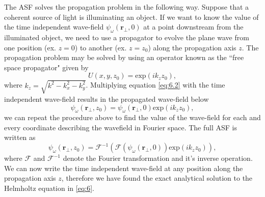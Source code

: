 \documentclass[10pt, a4paper, singlespacing]{report}
\begin{document}
The ASF solves the propagation problem in the following way. Suppose that a coherent source of light is illuminating an object. If we want to know the value of the time independent wave-field $\psi_{\omega}(\mathbf{r_{\perp}}, 0)$ at a point downstream from the illuminated object, we need to use a propagator to evolve the plane wave from one position (ex. $z = 0$) to another (ex. $z = z_0$) along the propagation axis $z$. The propagation problem may be solved by using an operator known as the ``free space propagator" given by
\begin{equation}\label{eq:6.2}
U(x, y, z_0) = \mathrm{exp} \left ( i k_z z_0 \right ),
\end{equation}
where $k_z = \sqrt{k^2 - k^{2}_{x} - k^{2}_{y}}$. Multiplying equation \ref{eq:6.2} with the time independent wave-field results in the propagated wave-field below
\begin{equation}\label{eq:6.5}
\psi_{\omega}(\mathbf{r_{\perp}}, z_0) = \psi_{\omega}(\mathbf{r_{\perp}}, 0) \mathrm{exp}(i k_z z_0), 
\end{equation}
we can repeat the procedure above to find the value of the wave-field for each and every coordinate describing the wavefield in Fourier space. The full ASF is  written as
\begin{equation}\label{eq:6.9}
\psi_{\omega}(\mathbf{r_{\perp}}, z_0) = \mathscr{F}^{-1} \left ( \mathscr{F} \left ( \psi_{\omega}(\mathbf{r_{\perp}}, 0) \right ) \mathrm{exp}(i k_z z_0) \right ), 
\end{equation}
where $\mathscr{F}$ and $\mathscr{F}^{-1}$ denote the Fourier transformation and it's inverse operation. We can now write the time independent wave-field at any position along the propagation axis $z$, therefore we have found the exact analytical solution to the Helmholtz equation in \ref{eq:6}.
\end{document}
